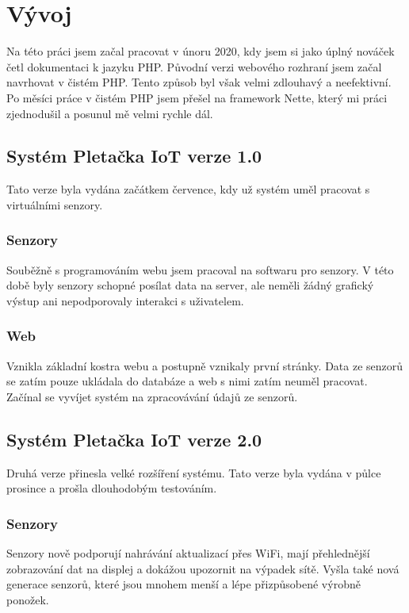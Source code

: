 \chapter{Vývoj}
Na této práci jsem začal pracovat v únoru 2020, kdy jsem si jako úplný nováček četl dokumentaci k jazyku PHP. 
Původní verzi webového rozhraní jsem začal navrhovat v čistém PHP. Tento způsob byl však velmi zdlouhavý a neefektivní.
Po měsíci práce v čistém PHP jsem přešel na framework Nette, který mi práci zjednodušil a posunul mě velmi rychle dál. 


\section{Systém Pletačka IoT verze 1.0}
Tato verze byla vydána začátkem července, kdy už systém uměl pracovat s virtuálními senzory.


\subsection{Senzory}
Souběžně s programováním webu jsem pracoval na softwaru pro senzory.
V této době byly senzory schopné posílat data na server, ale neměli žádný grafický výstup ani nepodporovaly interakci s uživatelem.

\subsection{Web}
Vznikla základní kostra webu a postupně vznikaly první stránky.
Data ze senzorů se zatím pouze ukládala do databáze a web s nimi zatím neuměl pracovat.
Začínal se vyvíjet systém na zpracovávání údajů ze senzorů.



\section{Systém Pletačka IoT verze 2.0}
Druhá verze přinesla velké rozšíření systému.
Tato verze byla vydána v půlce prosince a prošla dlouhodobým testováním.



\fxnote[author=JPA]{\textcolor{mygreen}{Jak dlouhým testováním? => Tato verze je produkčně nasazena od půlky prosince a do teď běží bez větších problémů.}}


\subsection{Senzory}
Senzory nově podporují nahrávání aktualizací přes WiFi, mají přehlednější zobrazování dat na displej a dokážou upozornit na výpadek sítě.
Vyšla také nová generace senzorů, které jsou mnohem menší a lépe přizpůsobené výrobně ponožek.


